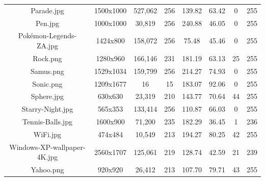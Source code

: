 \documentclass[10pt,a4paper]{article}
\begin{document}
\begin{table}[htbp]
\begin{tabular}{|c|c|c|c|c|c|c|c|}
    Parade.jpg               & 1500x1000  & 527,062 & 256 & 139.82 & 63.42  & 0 & 255 \\
    Pen.jpg                  & 1000x1000  & 30,819  & 256 & 240.88 & 46.05  & 0 & 255 \\
    Pokémon-Legends-ZA.jpg   & 1424x800   & 158,072 & 256 & 75.48  & 45.46  & 0 & 255 \\
    Rock.png                 & 1280x960   & 166,146 & 231 & 181.19 & 63.13  & 25 & 255 \\
    Samus.png                & 1529x1034  & 159,799 & 256 & 214.27 & 74.93  & 0 & 255 \\
    Sonic.png                & 1209x1677  & 16      & 15  & 183.07 &  92.06 & 0 & 255 \\
    Sphere.jpg               & 630x630    & 23,319  & 210 & 143.77 & 70.64  & 44 & 255 \\
    Starry-Night.jpg         & 565x353    & 133,414 & 256 & 110.87 & 66.03  & 0 & 255 \\
    Tennis-Balls.jpg         & 1600x900   & 71,200  & 235 & 182.29 & 36.45  & 1 & 236 \\
    WiFi.jpg                 & 474x484    & 10,549  & 213 & 194.27 & 80.25  & 42 & 255 \\
    Windows-XP-wallpaper-4K.jpg & 2560x1707 & 125,061 & 219 & 128.74 & 42.59  & 21 & 239 \\
    Yahoo.png                & 920x920    & 26,412  & 213 & 107.70 & 79.71  & 43 & 255 \\
    \hline
  \end{tabular}
\end{table}

\end{document}
